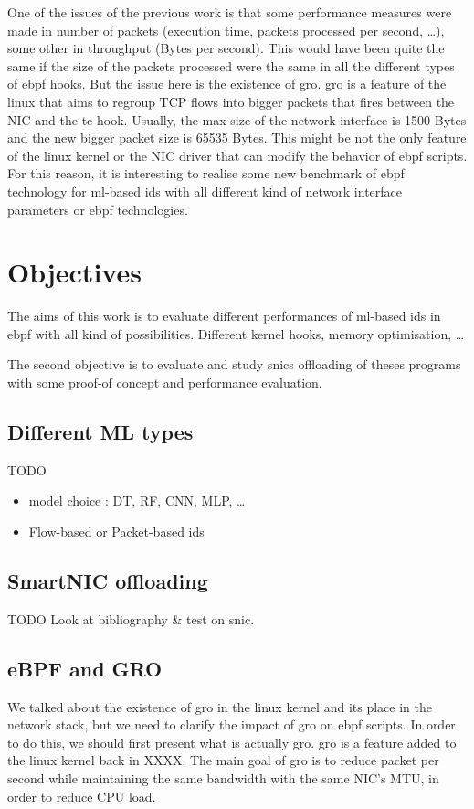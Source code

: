 \documentclass[conference]{IEEEtran}
\begin{document}
One of the issues of the previous work is that some performance measures were made in number of packets (execution time, packets processed per second, \dots), some other in throughput (Bytes per second). This would have been quite the same if the size of the packets processed were the same in all the different types of \gls{ebpf} hooks. But the issue here is the existence of \gls{gro}. \gls{gro} is a feature of the linux that aims to regroup TCP flows into bigger packets that fires between the NIC and the \gls{tc} hook. Usually, the max size of the network interface is 1500 Bytes and the new bigger packet size is 65535 Bytes.
This might be not the only feature of the linux kernel or the NIC driver that can modify the behavior of \gls{ebpf} scripts. For this reason, it is interesting to realise some new benchmark of \gls{ebpf} technology for \gls{ml}-based \gls{ids} with all different kind of network interface parameters or \gls{ebpf} technologies.

\section{Objectives}
The aims of this work is to evaluate different performances of \gls{ml}-based \gls{ids} in \gls{ebpf} with all kind of possibilities. Different kernel hooks, memory optimisation, \dots

The second objective is to evaluate and study \gls{snic}s offloading of theses programs with some proof-of concept and performance evaluation.

\subsection{Different ML types}
TODO

\begin{itemize}
    \item model choice : DT, RF, CNN, MLP, \dots
    \item Flow-based or Packet-based \gls{ids}
\end{itemize}

\subsection{SmartNIC offloading}

TODO
Look at bibliography \& test on \gls{snic}.

\subsection{eBPF and GRO}
We talked about the existence of \gls{gro} in the linux kernel and its place in the network stack, but we need to clarify the impact of \gls{gro} on \gls{ebpf} scripts. In order to do this, we should first present what is actually \gls{gro}. \gls{gro} is a feature added to the linux kernel back in XXXX. The main goal of \gls{gro} is to reduce packet per second while maintaining the same bandwidth with the same NIC's MTU, in order to reduce CPU load.%
\end{document}
